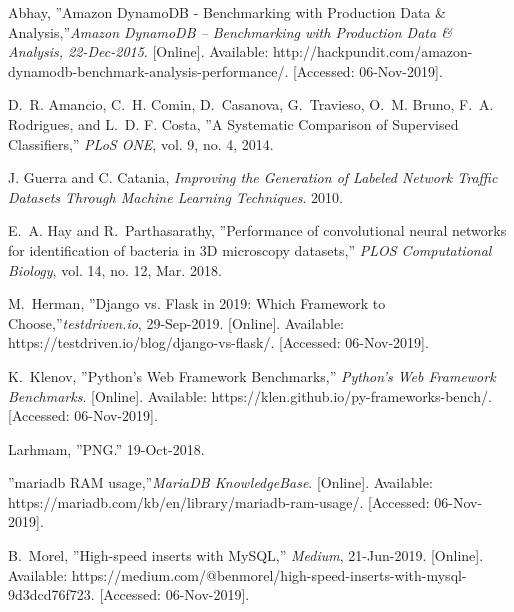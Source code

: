 \documentclass[12pt,journal,compsoc]{IEEEtran}
\begin{document}

%
\begin{thebibliography}{3}

\bibitem{}
Abhay, ''Amazon DynamoDB - Benchmarking with Production Data \& Analysis,''\emph{Amazon DynamoDB – Benchmarking with Production Data \& Analysis, 22-Dec-2015}. [Online]. Available: http://hackpundit.com/amazon-dynamodb-benchmark-analysis-performance/. [Accessed: 06-Nov-2019].

\bibitem{}
D.~R. Amancio, C.~H. Comin, D.~Casanova, G.~Travieso, O.~M. Bruno, F.~A. Rodrigues, and L.~D. F. Costa, ''A Systematic Comparison of Supervised Classifiers,'' \emph{PLoS ONE}, vol. 9, no. 4, 2014.

\bibitem{}
J. Guerra and C. Catania, \emph{Improving the Generation of Labeled Network Traffic Datasets Through Machine Learning Techniques}. 2010.
 
\bibitem{}
E.~A. Hay and R.~Parthasarathy, ''Performance of convolutional neural networks for identification of bacteria in 3D microscopy datasets,'' \emph{PLOS Computational Biology}, vol. 14, no. 12, Mar. 2018.

\bibitem{}
M.~Herman, ''Django vs. Flask in 2019: Which Framework to Choose,''\emph{testdriven.io}, 29-Sep-2019. [Online]. Available: https://testdriven.io/blog/django-vs-flask/. [Accessed: 06-Nov-2019].

\bibitem{}
K.~Klenov, ''Python's Web Framework Benchmarks,'' \emph{Python's Web Framework Benchmarks}. [Online]. Available: https://klen.github.io/py-frameworks-bench/. [Accessed: 06-Nov-2019].

\bibitem{}
Larhmam, ''PNG.'' 19-Oct-2018.
  
\bibitem{}
''mariadb RAM usage,''\emph{MariaDB KnowledgeBase}. [Online]. Available: https://mariadb.com/kb/en/library/mariadb-ram-usage/. [Accessed: 06-Nov-2019].

\bibitem{}
B.~Morel, ''High-speed inserts with MySQL,'' \emph{Medium}, 21-Jun-2019. [Online]. Available: https://medium.com/@benmorel/high-speed-inserts-with-mysql-9d3dcd76f723. [Accessed: 06-Nov-2019].


\end{thebibliography}
\end{document}
